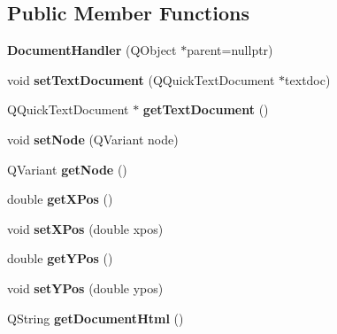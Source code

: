 \subsection*{Public Member Functions}
\begin{DoxyCompactItemize}
\item 
\mbox{\label{classDocumentHandler_abf07f38e288c50a5b154c776e75d8ba7}} 
{\bfseries Document\+Handler} (Q\+Object $\ast$parent=nullptr)
\item 
\mbox{\label{classDocumentHandler_a7d6d1a0cbcc8eb6fcd3f84d2dd082504}} 
void {\bfseries set\+Text\+Document} (Q\+Quick\+Text\+Document $\ast$textdoc)
\item 
\mbox{\label{classDocumentHandler_a0cd35353f607043bec0e2e5d9da2fd60}} 
Q\+Quick\+Text\+Document $\ast$ {\bfseries get\+Text\+Document} ()
\item 
\mbox{\label{classDocumentHandler_aa3ab0c2553bccd2bfea3463cd133b7a4}} 
void {\bfseries set\+Node} (Q\+Variant node)
\item 
\mbox{\label{classDocumentHandler_acd199a4ee29b54c1d23d1046cd2961f0}} 
Q\+Variant {\bfseries get\+Node} ()
\item 
\mbox{\label{classDocumentHandler_a1c107f1f558d56fa8164c7eac47f0411}} 
double {\bfseries get\+X\+Pos} ()
\item 
\mbox{\label{classDocumentHandler_a49dd035721a4252b2930cfa49b53b0d2}} 
void {\bfseries set\+X\+Pos} (double xpos)
\item 
\mbox{\label{classDocumentHandler_a327788c6a3d111e4f8c4b040cde17a78}} 
double {\bfseries get\+Y\+Pos} ()
\item 
\mbox{\label{classDocumentHandler_ad6f687b5df8747329d5885cd43243374}} 
void {\bfseries set\+Y\+Pos} (double ypos)
\item 
\mbox{\label{classDocumentHandler_a0374803be04479781943448e383fc80c}} 
Q\+String {\bfseries get\+Document\+Html} ()
\end{DoxyCompactItemize}
